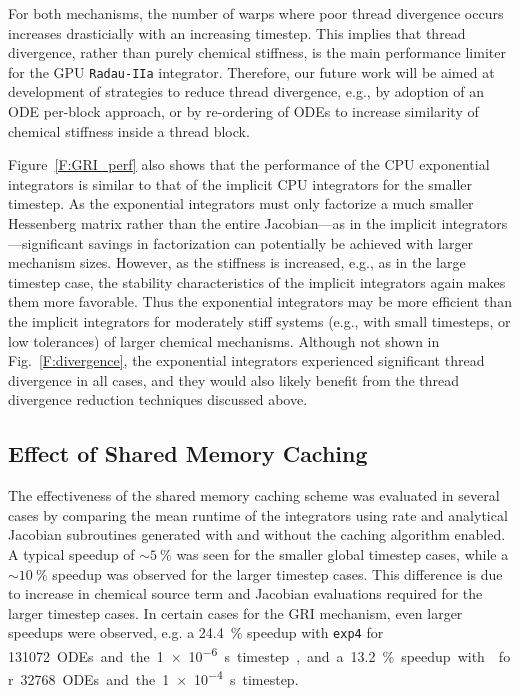 \documentclass[preprint]{elsarticle}
\begin{document}
For both mechanisms, the number of warps where poor thread divergence occurs increases drasticially with an increasing timestep.
This implies that thread divergence, rather than purely chemical stiffness, is the main performance limiter for the GPU \texttt{Radau-IIa} integrator.
Therefore, our future work will be aimed at development of strategies to reduce thread divergence, e.g., by adoption of an ODE per-block approach, or by re-ordering of ODEs to increase similarity of chemical stiffness inside a thread block.

Figure~\ref{F:GRI_perf} also shows that the performance of the CPU exponential integrators is similar to that of the implicit CPU integrators for the smaller timestep.
As the exponential integrators must only factorize a much smaller Hessenberg matrix rather than the entire Jacobian---as in the implicit integrators---significant savings in factorization can potentially be achieved with larger mechanism sizes.
However, as the stiffness is increased, e.g., as in the large timestep case, the stability characteristics of the implicit integrators again makes them more favorable.
Thus the exponential integrators may be more efficient than the implicit integrators for moderately stiff systems (e.g., with small timesteps, or low tolerances) of larger chemical mechanisms.
Although not shown in Fig.~\ref{F:divergence}, the exponential integrators experienced significant thread divergence in all cases, and they would also likely benefit from the thread divergence reduction techniques discussed above.

\subsection{Effect of Shared Memory Caching}
\label{S:smem}
The effectiveness of the shared memory caching scheme was evaluated in several cases by comparing the mean runtime of the integrators using rate and analytical Jacobian subroutines generated with and without the caching algorithm enabled.
A typical speedup of $\sim\SI{5}{\percent}$ was seen for the smaller global timestep cases, while a $\sim\SI{10}{\percent}$ speedup was observed for the larger timestep cases.
This difference is due to increase in chemical source term and Jacobian evaluations required for the larger timestep cases.
In certain cases for the GRI mechanism, even larger speedups were observed, e.g. a \SI{24.4}{\percent} speedup with \texttt{exp4} for \SI{131072} ODEs and the \SI{1e-6}{\s} timestep, and a \SI{13.2}{\percent} speedup with  for \SI{32768} ODEs and the \SI{1e-4}{\s} timestep.
\end{document}
